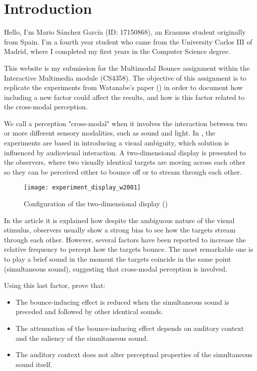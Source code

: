 \section{Introduction}

Hello, I'm Mario Sánchez García (ID: 17150868), an Erasmus student originally from Spain. I'm a fourth year student who came from the University Carlos III of Madrid, where I completed my first years in the Computer Science degree.

This website is my submission for the Multimodal Bounce assignment within the Interactive Multimedia module (CS4358). The objective of this assignment is to replicate the experiments from Watanabe's paper (\cite{watanabe2001}) in order to document how including a new factor could affect the results, and how is this factor related to the cross-modal perception.

We call a perception "cross-modal" when it involves the interaction between two or more different sensory modalities, such as sound and light. In \cite{watanabe2001}, the experiments are based in introducing a visual ambiguity, which solution is influenced by audiovisual interaction. A two-dimensional display is presented to the observers, where two visually identical targets are moving across each other so they can be perceived either to bounce off or to stream through each other. 

\begin{figure}[!ht]
		\centering
		\texttt{[image: experiment\_display\_w2001]}
		\caption{Configuration of the two-dimensional display (\cite{watanabe2001})}
\end{figure} 

In the article it is explained how despite the ambiguous nature of the visual stimulus, observers usually show a strong bias to see how the targets stream through each other. However, several factors have been reported to increase the relative frequency to percept how the targets bounce. The most remarkable one is to play a brief sound in the moment the targets coincide in the same point (simultaneous sound), suggesting that cross-modal perception is involved.

Using this last factor, \cite{watanabe2001} prove that:

\begin{itemize}
	\item The bounce-inducing effect is reduced when the simultaneous sound is preceded and followed by other identical sounds.
	\item The attenuation of the bounce-inducing effect depends on auditory context and the saliency of the simultaneous sound.
	\item The auditory context does not alter perceptual properties of the simultaneous sound itself.
\end{itemize}

